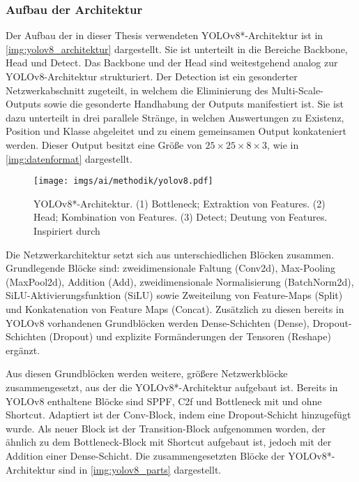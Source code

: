 \subsubsection{Aufbau der Architektur}
\label{sec:yolov8_aufbau}

Der Aufbau der in dieser Thesis verwendeten YOLOv8*-Architektur ist in \autoref{img:yolov8_architektur} dargestellt. Sie ist unterteilt in die Bereiche Backbone, Head und Detect. Das Backbone und der Head sind weitestgehend analog zur YOLOv8-Architektur strukturiert. Der Detection ist ein gesonderter Netzwerkabschnitt zugeteilt, in welchem die Eliminierung des Multi-Scale-Outputs sowie die gesonderte Handhabung der Outputs manifestiert ist. Sie ist dazu unterteilt in drei parallele Stränge, in welchen Auswertungen zu Existenz, Position und Klasse abgeleitet und zu einem gemeinsamen Output konkateniert werden. Dieser Output besitzt eine Größe von $25 \times 25 \times 8 \times 3$, wie in \autoref{img:datenformat} dargestellt.

\begin{figure}
    \centering
    \texttt{[image: imgs/ai/methodik/yolov8.pdf]}
    \caption{YOLOv8*-Architektur. (1) Bottleneck; Extraktion von Features. (2) Head; Kombination von Features. (3) Detect; Deutung von Features. Inspiriert durch \citeauthor{yolo_model_visualization_inspration} \cite{yolo_model_visualization_inspration}}
    \label{img:yolov8_architektur}
\end{figure}

Die Netzwerkarchitektur setzt sich aus unterschiedlichen Blöcken zusammen. Grundlegende Blöcke sind: zweidimensionale Faltung (Conv2d), Max-Pooling (MaxPool2d), Addition (Add), zweidimensionale Normalisierung (BatchNorm2d), SiLU-Aktivierungsfunktion (SiLU) sowie Zweiteilung von Feature-Maps (Split) und Konkatenation von Feature Maps (Concat). Zusätzlich zu diesen bereits in YOLOv8 vorhandenen Grundblöcken werden Dense-Schichten (Dense), Dropout-Schichten (Dropout) und explizite Formänderungen der Tensoren (Reshape) ergänzt.

Aus diesen Grundblöcken werden weitere, größere Netzwerkblöcke zusammengesetzt, aus der die YOLOv8*-Architektur aufgebaut ist. Bereits in YOLOv8 enthaltene Blöcke sind SPPF, C2f und Bottleneck mit und ohne Shortcut. Adaptiert ist der Conv-Block, indem eine Dropout-Schicht hinzugefügt wurde. Als neuer Block ist der Transition-Block aufgenommen worden, der ähnlich zu dem Bottleneck-Block mit Shortcut aufgebaut ist, jedoch mit der Addition einer Dense-Schicht. Die zusammengesetzten Blöcke der YOLOv8*-Architektur sind in \autoref{img:yolov8_parts} dargestellt.

